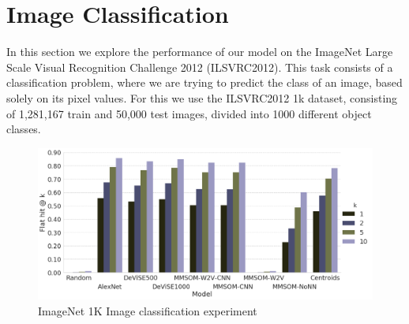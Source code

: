 \documentclass[a4paper]{standalone}
\begin{document}
\section{Image Classification}\label{sec:ImageClassification}

In this section we explore the performance of our model on the ImageNet Large Scale Visual Recognition Challenge 2012 (ILSVRC2012). This task consists of a classification problem, where we are trying to predict the class of an image, based solely on its pixel values. For this we use the ILSVRC2012 1k dataset, consisting of 1,281,167 train and 50,000 test images, divided into 1000 different object classes.

\begin{figure}[h]
    \centering
    \includegraphics[width=\textwidth]{images/image_classification_results.png}
    \caption{ImageNet 1K Image classification experiment}
    \label{fig:ImageNet1KResults}
\end{figure}
\end{document}

